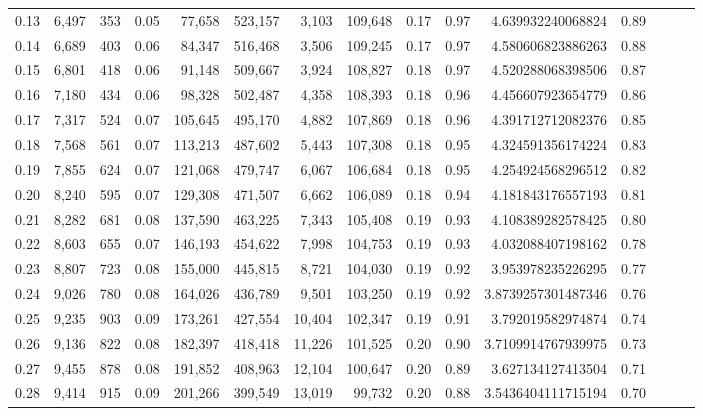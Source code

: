 \begin{tabular}{rrrrrrrrrrrrrrr}
0.13 &   6,497 &    353 &  0.05 &   77,658 &  523,157 &    3,103 &  109,648 &  0.17 &  0.97 &     4.639932240068824 &      0.89 \\
0.14 &   6,689 &    403 &  0.06 &   84,347 &  516,468 &    3,506 &  109,245 &  0.17 &  0.97 &     4.580606823886263 &      0.88 \\
0.15 &   6,801 &    418 &  0.06 &   91,148 &  509,667 &    3,924 &  108,827 &  0.18 &  0.97 &     4.520288068398506 &      0.87 \\
0.16 &   7,180 &    434 &  0.06 &   98,328 &  502,487 &    4,358 &  108,393 &  0.18 &  0.96 &     4.456607923654779 &      0.86 \\
0.17 &   7,317 &    524 &  0.07 &  105,645 &  495,170 &    4,882 &  107,869 &  0.18 &  0.96 &     4.391712712082376 &      0.85 \\
0.18 &   7,568 &    561 &  0.07 &  113,213 &  487,602 &    5,443 &  107,308 &  0.18 &  0.95 &     4.324591356174224 &      0.83 \\
0.19 &   7,855 &    624 &  0.07 &  121,068 &  479,747 &    6,067 &  106,684 &  0.18 &  0.95 &     4.254924568296512 &      0.82 \\
0.20 &   8,240 &    595 &  0.07 &  129,308 &  471,507 &    6,662 &  106,089 &  0.18 &  0.94 &     4.181843176557193 &      0.81 \\
0.21 &   8,282 &    681 &  0.08 &  137,590 &  463,225 &    7,343 &  105,408 &  0.19 &  0.93 &     4.108389282578425 &      0.80 \\
0.22 &   8,603 &    655 &  0.07 &  146,193 &  454,622 &    7,998 &  104,753 &  0.19 &  0.93 &     4.032088407198162 &      0.78 \\
0.23 &   8,807 &    723 &  0.08 &  155,000 &  445,815 &    8,721 &  104,030 &  0.19 &  0.92 &     3.953978235226295 &      0.77 \\
0.24 &   9,026 &    780 &  0.08 &  164,026 &  436,789 &    9,501 &  103,250 &  0.19 &  0.92 &    3.8739257301487346 &      0.76 \\
0.25 &   9,235 &    903 &  0.09 &  173,261 &  427,554 &   10,404 &  102,347 &  0.19 &  0.91 &     3.792019582974874 &      0.74 \\
0.26 &   9,136 &    822 &  0.08 &  182,397 &  418,418 &   11,226 &  101,525 &  0.20 &  0.90 &    3.7109914767939975 &      0.73 \\
0.27 &   9,455 &    878 &  0.08 &  191,852 &  408,963 &   12,104 &  100,647 &  0.20 &  0.89 &     3.627134127413504 &      0.71 \\
0.28 &   9,414 &    915 &  0.09 &  201,266 &  399,549 &   13,019 &   99,732 &  0.20 &  0.88 &    3.5436404111715194 &      0.70 \\

\end{tabular}
